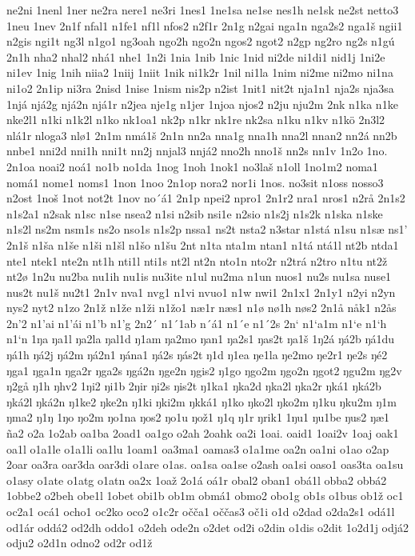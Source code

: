 ne2ni
1nenl
1ner
ne2ra
nere1
ne3ri
1nes1
1ne1sa
ne1se
nes1h
ne1sk
ne2st
netto3
1neu
1nev
2n1f
nfal1
n1fe1
nf1l
nfos2
n2f1r
2n1g
n2gai
nga1n
nga2s2
nga1š
ngii1
n2gis
ngi1t
ng3l
n1go1
ng3oah
ngo2h
ngo2n
ngos2
ngot2
n2gp
ng2ro
ng2s
n1gú
2n1h
nha2
nhal2
nhá1
nhe1
1n2i
1nia
1nib
1nic
1nid
ni2de
ni1di1
nid1j
1ni2e
ni1ev
1nig
1nih
niia2
1niij
1niit
1nik
ni1k2r
1nil
ni1la
1nim
ni2me
ni2mo
ni1na
ni1o2
2n1ip
ni3ra
2nisd
1nise
1nism
nis2p
n2ist
1nit1
nit2t
nja1n1
nja2s
nja3sa
1njá
njá2g
njá2n
njá1r
n2jea
nje1g
n1jer
1njoa
njos2
n2ju
nju2m
2nk
n1ka
n1ke
nke2l1
n1ki
n1k2l
n1ko
nk1oa1
nk2p
n1kr
nk1re
nk2sa
n1ku
n1kv
n1kö
2n3l2
nlá1r
nloga3
nlø1
2n1m
nmá1š
2n1n
nn2a
nna1g
nna1h
nna2l
nnan2
nn2á
nn2b
nnbe1
nni2d
nni1h
nni1t
nn2j
nnjal3
nnjá2
nno2h
nno1š
nn2s
nn1v
1n2o
1no.
2n1oa
noai2
noá1
no1b
no1da
1nog
1noh
1nok1
no3laš
n1oll
1no1m2
noma1
nomá1
nome1
noms1
1non
1noo
2n1op
nora2
nor1i
1nos.
no3sit
n1oss
nosso3
n2ost
1noš
1not
not2t
1nov
no´á1
2n1p
npei2
npro1
2n1r2
nra1
nros1
n2rå
2n1s2
n1s2a1
n2sak
n1sc
n1se
nsea2
n1si
n2sib
nsi1e
n2sio
n1s2j
n1s2k
n1ska
n1ske
n1s2l
ns2m
nsm1s
ns2o
nso1s
n1s2p
nssa1
ns2t
nsta2
n3star
n1stá
n1su
n1sæ
ns1'
2n1š
n1ša
n1še
n1ši
n1šl
n1šo
n1šu
2nt
n1ta
nta1m
ntan1
n1tá
ntá1l
nt2b
ntda1
nte1
ntek1
nte2n
nt1h
nti1l
nti1s
nt2l
nt2n
nto1n
nto2r
n2trá
n2tro
n1tu
nt2ž
nt2ø
1n2u
nu2ba
nu1ih
nu1is
nu3ite
n1ul
nu2ma
n1un
nuos1
nu2s
nu1sa
nuse1
nus2t
nu1š
nu2t1
2n1v
nva1
nvg1
n1vi
nvuo1
n1w
nwi1
2n1x1
2n1y1
n2yi
n2yn
nys2
nyt2
n1zo
2n1ž
n1že
n1ži
n1žo1
næ1r
næs1
n1ø
nø1h
nøs2
2n1å
nåk1
n2ås
2n'2
n1'ai
n1'ái
n1'b
n1'g
2n2´
n1´1ab
n´á1
n1´e
n1´2s
2n`
n1`a1m
n1`e
n1`h
n1`n
1ŋa
ŋa1l
ŋa2la
ŋal1d
ŋ1am
ŋa2mo
ŋan1
ŋa2s1
ŋas2t
ŋa1š
1ŋ2á
ŋá2b
ŋá1du
ŋá1h
ŋá2j
ŋá2m
ŋá2n1
ŋána1
ŋá2s
ŋás2t
ŋ1d
ŋ1ea
ŋe1la
ŋe2mo
ŋe2r1
ŋe2s
ŋé2
ŋga1
ŋga1n
ŋga2r
ŋga2s
ŋgá2n
ŋge2n
ŋgis2
ŋ1go
ŋgo2m
ŋgo2n
ŋgot2
ŋgu2m
ŋg2v
ŋ2gå
ŋ1h
ŋhv2
1ŋi2
ŋi1b
2ŋir
ŋi2s
ŋis2t
ŋ1ka1
ŋka2d
ŋka2l
ŋka2r
ŋká1
ŋká2b
ŋká2l
ŋká2n
ŋ1ke2
ŋke2n
ŋ1ki
ŋki2m
ŋkká1
ŋ1ko
ŋko2l
ŋko2m
ŋ1ku
ŋku2m
ŋ1m
ŋma2
ŋ1ŋ
1ŋo
ŋo2m
ŋo1na
ŋos2
ŋo1u
ŋož1
ŋ1q
ŋ1r
ŋrik1
1ŋu1
ŋu1be
ŋus2
ŋæ1
ña2
o2a
1o2ab
oa1ba
2oad1
oa1go
o2ah
2oahk
oa2i
1oai.
oaid1
1oai2v
1oaj
oak1
oa1l
o1a1le
o1a1li
oa1lu
1oam1
oa3ma1
oamas3
o1a1me
oa2n
oa1ni
o1ao
o2ap
2oar
oa3ra
oar3da
oar3di
o1are
o1as.
oa1sa
oa1se
o2ash
oa1si
oaso1
oas3ta
oa1su
o1asy
o1ate
o1atg
o1atn
oa2x
1oaž
2o1á
oá1r
obal2
oban1
obá1l
obba2
obbá2
1obbe2
o2beh
obe1l
1obet
obi1b
ob1m
obmá1
obmo2
obo1g
ob1s
o1bus
ob1ž
oc1
oc2a1
ocá1
ocho1
oc2ko
oco2
o1c2r
očča1
oččas3
oč1i
o1d
o2dad
o2da2s1
odá1l
od1ár
oddá2
od2dh
oddo1
o2deh
ode2n
o2det
od2i
o2din
o1dis
o2dit
1o2d1j
odjá2
odju2
o2d1n
odno2
od2r
od1ž
